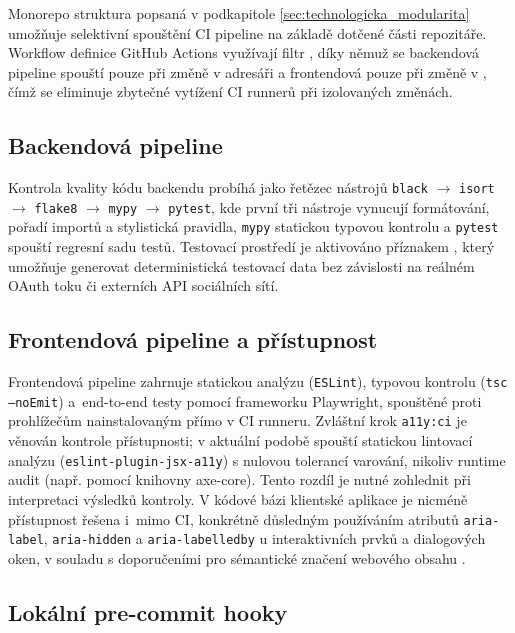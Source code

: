 \documentclass[male,czech,api_bc]{kitheses}
\begin{document}
Monorepo struktura popsaná v podkapitole \vref{sec:technologicka_modularita} umožňuje 
selektivní spouštění CI pipeline na základě dotčené části repozitáře. Workflow definice 
GitHub Actions využívají filtr , díky němuž se backendová pipeline spouští 
pouze při změně v adresáři  a frontendová pouze při změně v , 
čímž se eliminuje zbytečné vytížení CI runnerů při izolovaných změnách.

\subsection{Backendová pipeline}

Kontrola kvality kódu backendu probíhá jako řetězec nástrojů 
\texttt{black} $\rightarrow$ \texttt{isort} $\rightarrow$ \texttt{flake8} $\rightarrow$ 
\texttt{mypy} $\rightarrow$ \texttt{pytest}, kde první tři nástroje vynucují formátování, 
pořadí importů a stylistická pravidla, \texttt{mypy} statickou typovou kontrolu a 
\texttt{pytest} spouští regresní sadu testů. Testovací prostředí je aktivováno příznakem 
, který umožňuje generovat deterministická testovací 
data bez závislosti na reálném OAuth toku či externích API sociálních sítí.

\subsection{Frontendová pipeline a přístupnost}

Frontendová pipeline zahrnuje statickou analýzu (\texttt{ESLint}), typovou kontrolu 
(\texttt{tsc --noEmit}) a~end-to-end testy pomocí frameworku Playwright, spouštěné proti 
prohlížečům nainstalovaným přímo v CI runneru. Zvláštní krok \texttt{a11y:ci} je věnován 
kontrole přístupnosti; v aktuální podobě spouští statickou lintovací analýzu 
(\texttt{eslint-plugin-jsx-a11y}) s nulovou tolerancí varování, nikoliv runtime audit 
(např. pomocí knihovny axe-core). Tento rozdíl je nutné zohlednit při interpretaci 
výsledků kontroly. V kódové bázi klientské aplikace je nicméně přístupnost řešena i~mimo 
CI, konkrétně důsledným používáním atributů \texttt{aria-label}, \texttt{aria-hidden} a 
\texttt{aria-labelledby} u interaktivních prvků a dialogových oken, v souladu s doporučeními 
pro sémantické značení webového obsahu \cite{Mills2025}.

\subsection{Lokální pre-commit hooky}
\end{document}
